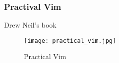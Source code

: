 \begin{frame}[fragile]
  \frametitle{Practival Vim}
  Drew Neil's book~\cite{neil2015practical}
  \begin{figure}
    \centering
    \texttt{[image: practical\_vim.jpg]}
    \caption{Practical Vim}
    \label{fig:practical-vim}
  \end{figure}
\end{frame}
